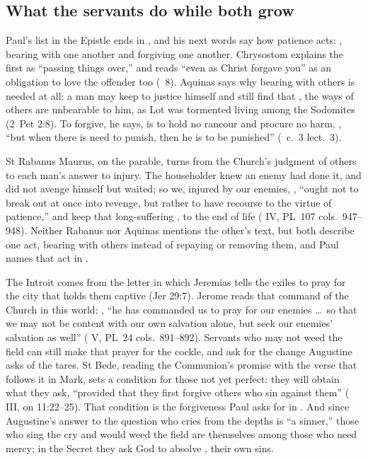 \subsection{What the servants do while both grow}

Paul's list in the Epistle ends in , and his next words say
how patience acts: ,
bearing with one another and forgiving one another. Chrysostom explains the
first as ``passing things over,'' and reads ``even as Christ forgave you'' as
an obligation to love the offender too (\ 8). Aquinas says
why bearing with others is needed at all: a man may keep to justice himself
and still find that , the ways of
others are unbearable to him, as Lot was tormented living among the Sodomites
(2~Pet 2:8). To forgive, he says, is to hold no rancour and procure no harm,
, ``but when
there is need to punish, then he is to be punished'' (\ c.~3
lect.~3).

St Rabanus Maurus, on the parable, turns from the Church's judgment of others
to each man's answer to injury. The householder knew an enemy had done it,
and did not avenge himself but waited; so we, injured by our enemies,
, ``ought not to break out at once into revenge, but rather
to have recourse to the virtue of patience,'' and keep that long-suffering
, to the end of life ( IV,
PL~107 cols.~947--948). Neither Rabanus nor Aquinas mentions the other's
text, but both describe one act, bearing with others instead of repaying or
removing them, and Paul names that act in .

The Introit comes from the letter in which Jeremias tells the exiles to pray
for the city that holds them captive (Jer 29:7). Jerome reads that command of
the Church in this world: , ``he
has commanded us to pray for our enemies \dots\ so that we may not be content
with our own salvation alone, but seek our enemies' salvation as well''
( V, PL~24 cols.~891--892). Servants who may not weed the
field can still make that prayer for the cockle, and ask for the change
Augustine asks of the tares. St Bede, reading the Communion's promise with
the verse that follows it in Mark, sets a condition for those not yet
perfect: they will obtain what they ask, ``provided that they first forgive
others who sin against them'' ( III, on
11:22--25). That condition is the forgiveness Paul asks for in
. And since Augustine's answer to the question
who cries from the depths is ``a sinner,'' those who sing the cry and would
weed the field are themselves among those who need mercy; in the Secret they
ask God to absolve , their own sins.

